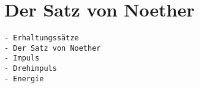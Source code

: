 %
%
%
\section{Der Satz von Noether
\label{buch:symmetrien:section:noether}}

\begin{verbatim}
- Erhaltungssätze
- Der Satz von Noether
- Impuls
- Drehimpuls
- Energie
\end{verbatim}
